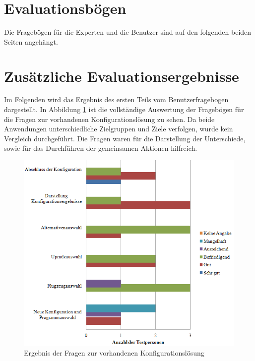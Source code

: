  
\section{Evaluationsbögen} \label{anhangEva}
Die Fragebögen für die Experten und die Benutzer sind auf den folgenden beiden Seiten angehängt.




\section{Zusätzliche Evaluationsergebnisse} \label{anhangEvaErg}
Im Folgenden wird das Ergebnis des ersten Teils vom Benutzerfragebogen dargestellt. In Abbildung \ref{bewertungWebguiComplete} ist die vollständige Auswertung der Fragebögen für die Fragen zur vorhandenen Konfigurationslösung zu sehen. Da beide Anwendungen unterschiedliche Zielgruppen und Ziele verfolgen, wurde kein Vergleich durchgeführt. Die Fragen waren für die Darstellung der Unterschiede, sowie für das Durchführen der gemeinsamen Aktionen hilfreich. \par 
\begin{figure}[H]
\centering
\includegraphics{images/bewertung_webgui}
\caption{Ergebnis der Fragen zur vorhandenen Konfigurationslösung}
\label{bewertungWebguiComplete}
\end{figure}
